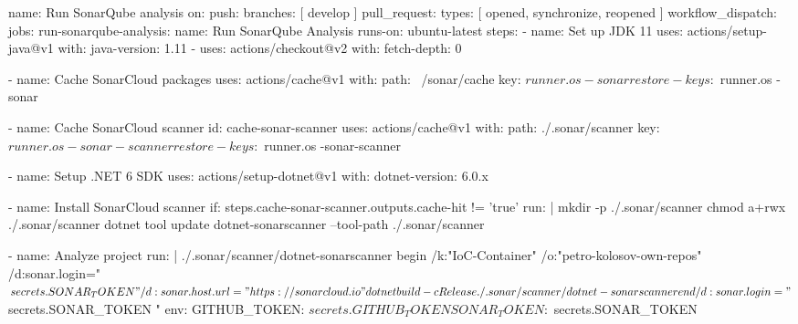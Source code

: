 \begin{spverbatim}
name: Run SonarQube analysis
on:
  push:
    branches: [ develop ]
  pull_request:
    types: [ opened, synchronize, reopened ]
  workflow_dispatch:
jobs:
  run-sonarqube-analysis:
    name: Run SonarQube Analysis
    runs-on: ubuntu-latest
    steps:
      - name: Set up JDK 11
        uses: actions/setup-java@v1
        with:
          java-version: 1.11
      - uses: actions/checkout@v2
        with:
          fetch-depth: 0

      - name: Cache SonarCloud packages
        uses: actions/cache@v1
        with:
          path: ~/sonar/cache
          key: ${{ runner.os }}-sonar
          restore-keys: ${{ runner.os }}-sonar

      - name: Cache SonarCloud scanner
        id: cache-sonar-scanner
        uses: actions/cache@v1
        with:
          path: ./.sonar/scanner
          key: ${{ runner.os }}-sonar-scanner
          restore-keys: ${{ runner.os }}-sonar-scanner

      - name: Setup .NET 6 SDK
        uses: actions/setup-dotnet@v1
        with:
          dotnet-version: 6.0.x

      - name: Install SonarCloud scanner
        if: steps.cache-sonar-scanner.outputs.cache-hit != 'true'
        run: |
          mkdir -p ./.sonar/scanner
          chmod a+rwx ./.sonar/scanner
          dotnet tool update dotnet-sonarscanner --tool-path ./.sonar/scanner

      - name: Analyze project
        run: |
          ./.sonar/scanner/dotnet-sonarscanner begin /k:"IoC-Container" /o:"petro-kolosov-own-repos" /d:sonar.login="${{ secrets.SONAR_TOKEN }}" /d:sonar.host.url="https://sonarcloud.io"
          dotnet build -c Release
          ./.sonar/scanner/dotnet-sonarscanner end /d:sonar.login="${{ secrets.SONAR_TOKEN }}"
        env:
          GITHUB_TOKEN: ${{ secrets.GITHUB_TOKEN }}
          SONAR_TOKEN: ${{ secrets.SONAR_TOKEN }}
\end{spverbatim}